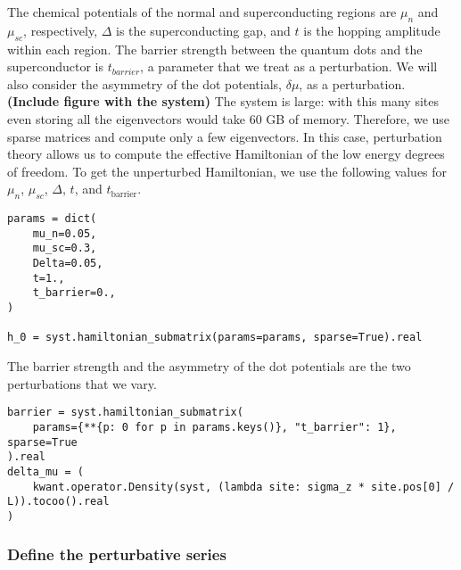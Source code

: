 The chemical potentials of the normal and superconducting regions are $\mu_n$
and $\mu_{sc}$, respectively, $\Delta$ is the superconducting gap, and $t$
is the hopping amplitude within each region.
The barrier strength between the quantum dots and the superconductor is
$t_{barrier}$, a parameter that we treat as a perturbation.
We will also consider the asymmetry of the dot potentials, $\delta \mu$, as a
perturbation.
%
\textbf{(Include figure with the system)}
%
The system is large: with this many sites even storing all the eigenvectors
would take 60 GB of memory.
Therefore, we use sparse matrices and compute only a few eigenvectors.
In this case, perturbation theory allows us to compute the effective
Hamiltonian of the low energy degrees of freedom.
%
To get the unperturbed Hamiltonian, we use the following values for $\mu_n$,
$\mu_{sc}$, $\Delta$, $t$, and $t_{\text{barrier}}$.
%
\begin{verbatim}
params = dict(
    mu_n=0.05,
    mu_sc=0.3,
    Delta=0.05,
    t=1.,
    t_barrier=0.,
)

h_0 = syst.hamiltonian_submatrix(params=params, sparse=True).real
\end{verbatim}

The barrier strength and the asymmetry of the dot potentials are the two
perturbations that we vary.

\begin{verbatim}
barrier = syst.hamiltonian_submatrix(
    params={**{p: 0 for p in params.keys()}, "t_barrier": 1}, sparse=True
).real
delta_mu = (
    kwant.operator.Density(syst, (lambda site: sigma_z * site.pos[0] / L)).tocoo().real
)
\end{verbatim}

\subsubsection{Define the perturbative series}

